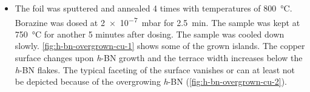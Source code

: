 \begin{itemize}
 \item The foil was sputtered and annealed 4 times with temperatures of \SI{800}{\celsius}. Borazine was dosed at \SI{2e-7}{\milli \bar} for \SI{2.5}{\minute}. The sample was kept at \SI{750}{\celsius} for another 5 minutes after dosing. The sample was cooled down slowly. \autoref{fig:h-bn-overgrown-cu-1} shows some of the grown islands. The copper surface changes upon \textit{h}-BN growth and the terrace width increases below the \textit{h}-BN flakes. The typical faceting of the surface vanishes or can at least not be depicted because of the overgrowing \textit{h}-BN (\autoref{fig:h-bn-overgrown-cu-2}). 
\end{itemize}

